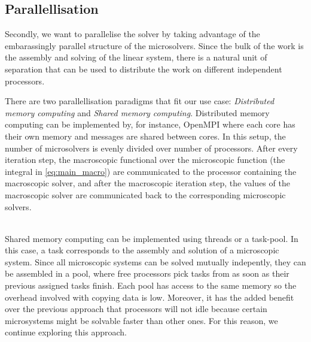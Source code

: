 \documentclass{article}
\begin{document}
\subsection{Parallellisation}

Secondly, we want to parallelise the solver by taking advantage of the embarassingly parallel structure of the microsolvers. Since the bulk of the work is the assembly and solving of the linear system, there is a natural unit of separation that can be used to distribute the work on different independent processors.


There are two parallellisation paradigms that fit our use case: \emph{Distributed memory computing} and \emph{Shared memory computing}.
Distributed memory computing can be implemented by, for instance, OpenMPI where each core has their own memory and messages are shared between cores.
In this setup, the number of microsolvers is evenly divided over number of processors.
After every iteration step, the macroscopic functional over the microscopic function (the integral in \eqref{eq:main_macro}) are communicated to the processor containing the macroscopic solver, and after the macroscopic iteration step, the values of the macroscopic solver are communicated back to the corresponding microscopic solvers.

\ \\
Shared memory computing can be implemented using threads or a task-pool. In this case, a task corresponds to the assembly and solution of a microscopic system. Since all microscopic systems can be solved mutually indepently, they can be assembled in a pool, where free processors pick tasks from as soon as their previous assigned tasks finish. Each pool has access to the same memory so the overhead involved with copying data is low. Moreover, it has the added benefit over the previous approach that processors will not idle because certain microsystems might be solvable faster than other ones. For this reason, we continue exploring this approach.



\end{document}

